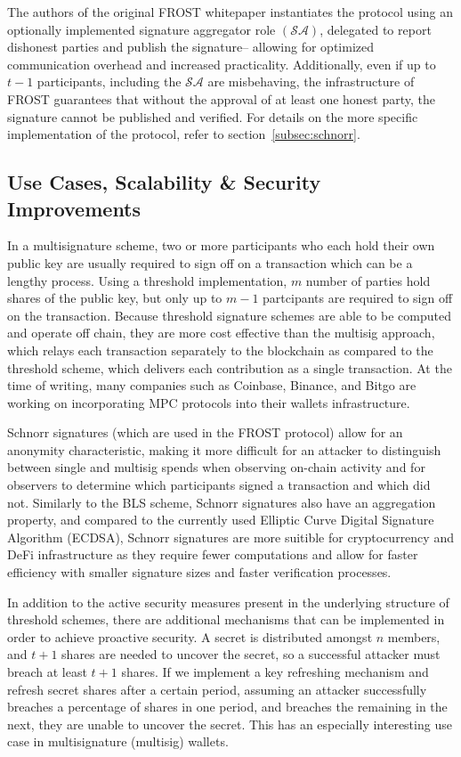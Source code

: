 \documentclass[12pt]{article}
\begin{document}
The authors of the original FROST whitepaper instantiates the protocol using an optionally implemented signature aggregator role \( (\mathcal{SA})\), delegated to report dishonest parties and publish the signature-- allowing for optimized communication overhead and increased practicality. Additionally, even if up to \(t-1\) participants, including the \( \mathcal{SA}\) are misbehaving, the infrastructure of FROST guarantees that without the approval of at least one honest party, the signature cannot be published and verified. For details on the more specific implementation of the protocol, refer to section~\ref{subsec:schnorr}.

\subsection{Use Cases, Scalability \& Security Improvements}

In a multisignature scheme, two or more participants who each hold their own public key are usually required to sign off on a transaction which can be a lengthy process. Using a threshold implementation, \(m\) number of parties hold shares of the public key, but only up to \(m-1\) partcipants are required to sign off on the transaction. Because threshold signature schemes are able to be computed and operate off chain, they are more cost effective than the multisig approach, which relays each transaction separately to the blockchain as compared to the threshold scheme, which delivers each contribution as a single transaction. At the time of writing, many companies such as Coinbase, Binance, and Bitgo are working on incorporating MPC protocols into their wallets infrastructure. 

Schnorr signatures (which are used in the FROST protocol) allow for an anonymity characteristic, making it more difficult for an attacker to distinguish between single and multisig spends when observing on-chain activity and for observers to determine which participants signed a transaction and which did not. Similarly to the BLS scheme, Schnorr signatures also have an aggregation property, and compared to the currently used Elliptic Curve Digital Signature Algorithm (ECDSA), Schnorr signatures are more suitible for cryptocurrency and DeFi infrastructure as they require fewer computations and allow for faster efficiency with smaller signature sizes and faster verification processes.  

In addition to the active security measures present in the underlying structure of threshold schemes, there are additional mechanisms that can be implemented in order to achieve proactive security. A secret is distributed amongst \(n\) members, and \(t+1\) shares are needed to uncover the secret, so a successful attacker must breach at least \(t+1\) shares. If we implement a key refreshing mechanism and refresh secret shares after a certain period, assuming an attacker successfully breaches a percentage of shares in one period, and breaches the remaining in the next, they are unable to uncover the secret. This has an especially interesting use case in multisignature (multisig) wallets. 
\end{document}
